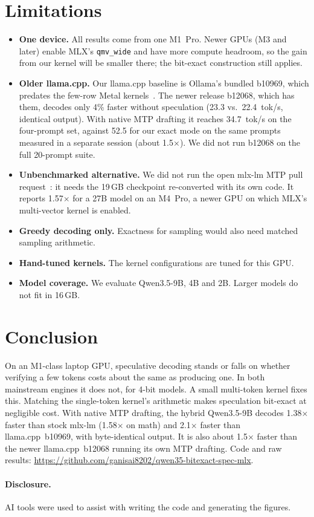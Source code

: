 \documentclass[11pt]{article}
\begin{document}
\section{Limitations}
\begin{itemize}
\item \textbf{One device.} All results come from one M1~Pro. Newer GPUs (M3 and later) enable MLX's \texttt{qmv\_wide} and have more compute headroom, so the gain from our kernel will be smaller there; the bit-exact construction still applies.
\item \textbf{Older llama.cpp.} Our llama.cpp baseline is Ollama's bundled b10969, which predates the few-row Metal kernels~\cite{narola2026fewrow}. The newer release b12068, which has them, decodes only 4\% faster without speculation (23.3 vs.\ 22.4~tok/s, identical output). With native MTP drafting it reaches 34.7~tok/s on the four-prompt set, against 52.5 for our exact mode on the same prompts measured in a separate session (about 1.5$\times$). We did not run b12068 on the full 20-prompt suite.
\item \textbf{Unbenchmarked alternative.} We did not run the open mlx-lm MTP pull request~\cite{airrunner2026mlxlmmtp}: it needs the 19\,GB checkpoint re-converted with its own code. It reports 1.57$\times$ for a 27B model on an M4~Pro, a newer GPU on which MLX's multi-vector kernel is enabled.
\item \textbf{Greedy decoding only.} Exactness for sampling would also need matched sampling arithmetic.
\item \textbf{Hand-tuned kernels.} The kernel configurations are tuned for this GPU.
\item \textbf{Model coverage.} We evaluate Qwen3.5-9B, 4B and 2B. Larger models do not fit in 16\,GB.
\end{itemize}

\section{Conclusion}
On an M1-class laptop GPU, speculative decoding stands or falls on whether verifying a few tokens costs about the same as producing one. In both mainstream engines it does not, for 4-bit models. A small multi-token kernel fixes this. Matching the single-token kernel's arithmetic makes speculation bit-exact at negligible cost. With native MTP drafting, the hybrid Qwen3.5-9B decodes 1.38$\times$ faster than stock mlx-lm (1.58$\times$ on math) and 2.1$\times$ faster than llama.cpp~b10969, with byte-identical output. It is also about 1.5$\times$ faster than the newer llama.cpp~b12068 running its own MTP drafting. Code and raw results: \url{https://github.com/ganisai8202/qwen35-bitexact-spec-mlx}.

\paragraph{Disclosure.} AI tools were used to assist with writing the code and generating the figures.



\end{document}
